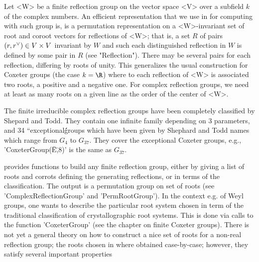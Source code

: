 

Let  <W>  be  a  finite  reflection  group  on  the vector space <V> over a
subfield  $k$ of the  complex numbers. An  efficient representation that we
use  in  {\CHEVIE}  for  computing  with  such  group  is, is a permutation
representation  on  a  <W>-invariant  set  of  root  and coroot vectors for
reflections  of <W>;  that is,  a set  $R$ of  pairs $(r,r^\vee)\in V\times
V^{\*}$  invariant by  $W$ and  such each  distinguished reflection in $W$ is
defined  by some pair in $R$ (see "Reflection"). There may be several pairs
for  each reflection,  differing by  roots of  unity. This  generalizes the
usual  construction  for  Coxeter  groups  (the  case $k=\R$) where to each
reflection  of <W> is associated two roots,  a positive and a negative one.
For  complex reflection groups, we  need at least as  many roots on a given
line  as the order of the center of  <W>.

The  finite  irreducible  complex  reflection  groups  have been completely
classified  by Shepard and Todd. They contain one infinite family depending
on  3 parameters, and 34 ``exceptional\'\'  groups which have been given by
Shephard  and Todd names which range from $G_4$ to $G_{37}$. They cover the
exceptional  Coxeter groups,  e.g., 'CoxeterGroup(\"E\",8)'  is the same as
$G_{37}$.

{\CHEVIE}  provides functions to build  any finite reflection group, either
by  giving a list of roots and corrots defining the generating reflections,
or in terms of the classification. The output is a permutation group on set
of roots (see 'ComplexReflectionGroup' and 'PermRootGroup'). In the context
e.g.  of  Weyl  groups,  one  wants  to describe the particular root system
chosen  in term of the  traditional classification of crystallographic root
systems.  This is  done via  calls to  the function 'CoxeterGroup' (see the
chapter on finite Coxeter groups). There is not yet a general theory on how
to construct a nice set of roots for a non-real reflection group; the roots
chosen  in  {\CHEVIE}  where  obtained  case-by-case; however, they satisfy
several important properties\:

